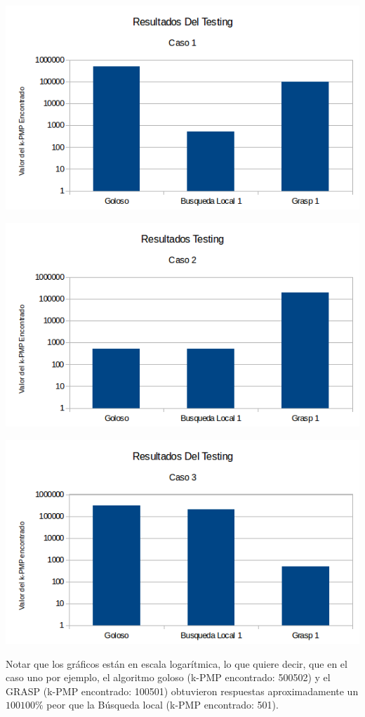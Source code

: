 \includegraphics[scale=0.7]{Con/dificil1.png}

\includegraphics[scale=0.7]{Con/dificil2.png}

\includegraphics[scale=0.7]{Con/dificil3.png}

Notar que los gráficos están en escala logarítmica, lo que quiere decir, que en el caso uno por ejemplo, el algoritmo goloso (k-PMP encontrado: 500502) y el GRASP (k-PMP encontrado: 100501) obtuvieron respuestas aproximadamente un $100100 \%$ peor que la Búsqueda local (k-PMP encontrado: 501).

